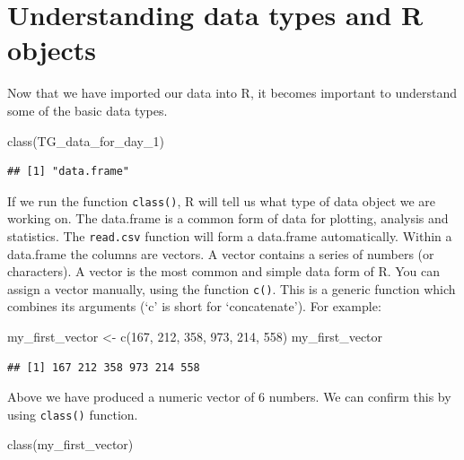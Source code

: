 \documentclass[
]{book}
\newenvironment{Shaded}{\begin{snugshade}}{\end{snugshade}}
\newcommand{\DecValTok}[1]{\textcolor[rgb]{0.00,0.00,0.81}{#1}}
\newcommand{\FunctionTok}[1]{\textcolor[rgb]{0.00,0.00,0.00}{#1}}
\newcommand{\NormalTok}[1]{#1}
\newcommand{\OtherTok}[1]{\textcolor[rgb]{0.56,0.35,0.01}{#1}}
\begin{document}
\hypertarget{understanding-data-types-and-r-objects}{%
\section{Understanding data types and R objects}\label{understanding-data-types-and-r-objects}}

Now that we have imported our data into R, it becomes important to understand some of the basic data types.

\begin{Shaded}
\begin{Highlighting}[]
\FunctionTok{class}\NormalTok{(TG\_data\_for\_day\_1)}
\end{Highlighting}
\end{Shaded}

\begin{verbatim}
## [1] "data.frame"
\end{verbatim}

If we run the function \texttt{class()}, R will tell us what type of data object we are working on. The data.frame is a common form of data for plotting, analysis and statistics. The \texttt{read.csv} function will form a data.frame automatically. Within a data.frame the columns are vectors. A vector contains a series of numbers (or characters). A vector is the most common and simple data form of R. You can assign a vector manually, using the function \texttt{c()}. This is a generic function which combines its arguments (`c' is short for `concatenate'). For example:

\begin{Shaded}
\begin{Highlighting}[]
\NormalTok{my\_first\_vector }\OtherTok{\textless{}{-}} \FunctionTok{c}\NormalTok{(}\DecValTok{167}\NormalTok{, }\DecValTok{212}\NormalTok{, }\DecValTok{358}\NormalTok{, }\DecValTok{973}\NormalTok{, }\DecValTok{214}\NormalTok{, }\DecValTok{558}\NormalTok{)}
\NormalTok{my\_first\_vector}
\end{Highlighting}
\end{Shaded}

\begin{verbatim}
## [1] 167 212 358 973 214 558
\end{verbatim}

Above we have produced a numeric vector of 6 numbers. We can confirm this by using \texttt{class()} function.

\begin{Shaded}
\begin{Highlighting}[]
\FunctionTok{class}\NormalTok{(my\_first\_vector)}
\end{Highlighting}
\end{Shaded}
\end{document}
